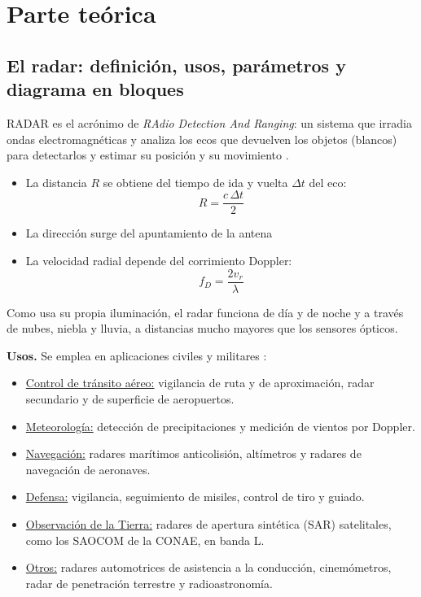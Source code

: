 \section{Parte teórica}
\label{sec:teorico}

\subsection{El radar: definición, usos, parámetros y diagrama en bloques}
\label{sec:radar}

RADAR es el acrónimo de \textit{RAdio Detection And Ranging}: un sistema que irradia ondas electromagnéticas y analiza los ecos que devuelven los objetos (blancos) para detectarlos y estimar su posición y su movimiento \cite{skolnik, apunte}. 

\begin{itemize}
    \item La distancia $R$ se obtiene del tiempo de ida y vuelta $\Delta t$ del eco:
        \begin{equation}
            R = \frac{c \, \Delta t}{2}
        \end{equation}
    \item La dirección surge del apuntamiento de la antena
    \item La velocidad radial depende del corrimiento Doppler:
        \begin{equation}
            f_D = \frac{2 v_r}{\lambda} 
        \end{equation}
\end{itemize}

Como usa su propia iluminación, el radar funciona de día y de noche y a través de nubes, niebla y lluvia, a distancias mucho mayores que los sensores ópticos.

\textbf{Usos.} Se emplea en aplicaciones civiles y militares \cite{skolnik}:
\begin{itemize}
    \item \underline{Control de tránsito aéreo:} vigilancia de ruta y de aproximación, radar secundario y de superficie de aeropuertos.
    \item \underline{Meteorología:} detección de precipitaciones y medición de vientos por Doppler.
    \item \underline{Navegación:} radares marítimos anticolisión, altímetros y radares de navegación de aeronaves.
    \item \underline{Defensa:} vigilancia, seguimiento de misiles, control de tiro y guiado.
    \item \underline{Observación de la Tierra:} radares de apertura sintética (SAR) satelitales, como los SAOCOM de la CONAE, en banda L.
    \item \underline{Otros:} radares automotrices de asistencia a la conducción, cinemómetros, radar de penetración terrestre y radioastronomía.
\end{itemize}

